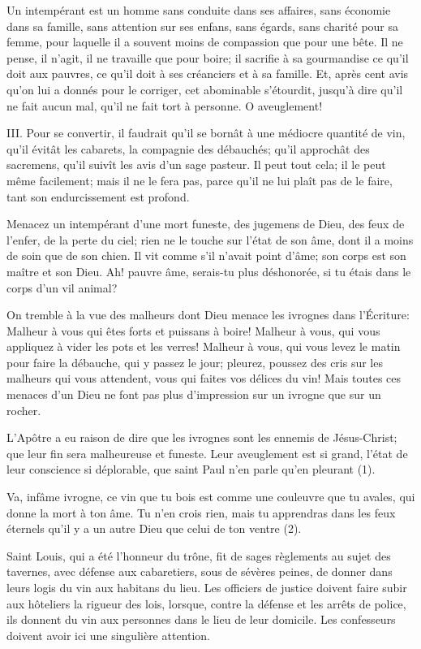 \documentclass[instructions.tex]{subfiles}
\begin{document}
Un intempérant est un homme sans conduite dans ses affaires, sans économie dans sa famille, sans attention sur ses enfans, sans égards, sans charité pour sa femme, pour laquelle il a souvent moins de compassion que pour une bête. Il ne pense, il n'agit, il ne travaille que pour boire; il sacrifie à sa gourmandise ce qu'il doit aux pauvres, ce qu'il doit à ses créanciers et à sa famille. Et, après cent avis qu'on lui a donnés pour le corriger, cet abominable s'étourdit, jusqu'à dire qu'il ne fait aucun mal, qu'il ne fait tort à personne. O aveuglement!
 
III. Pour se convertir, il faudrait qu'il se bornât à une médiocre quantité de vin, qu'il évitât les cabarets, la compagnie des débauchés; qu'il approchât des sacremens, qu'il suivît les avis d'un sage pasteur. Il peut tout cela; il le peut même facilement; mais il ne le fera pas, parce qu'il ne lui plaît pas de le faire, tant son endurcissement est profond.
 
Menacez un intempérant d'une mort funeste, des jugemens de Dieu, des feux de l'enfer, de la perte du ciel; rien ne le touche sur l'état de son âme, dont il a moins de soin que de son chien. Il vit comme s'il n'avait point d'âme; son corps est son maître et son Dieu. Ah! pauvre âme, serais-tu plus déshonorée, si tu étais dans le corps d'un vil animal?
 
On tremble à la vue des malheurs dont Dieu menace les ivrognes dans l'Écriture: Malheur à vous qui êtes forts et puissans à boire! Malheur à vous, qui vous appliquez à vider les pots et les verres! Malheur à vous, qui vous levez le matin pour faire la débauche, qui y passez le jour; pleurez, poussez des cris sur les malheurs qui vous attendent, vous qui faites vos délices du vin! Mais toutes ces menaces d'un Dieu ne font pas plus d'impression sur un ivrogne que sur un rocher.
 
L'Apôtre a eu raison de dire que les ivrognes sont les ennemis de Jésus-Christ; que leur fin sera malheureuse et funeste. Leur aveuglement est si grand, l'état de leur conscience si déplorable, que saint Paul n'en parle qu'en pleurant (1).
 
Va, infâme ivrogne, ce vin que tu bois est comme une couleuvre que tu avales, qui donne la mort à ton âme. Tu n'en crois rien, mais tu apprendras dans les feux éternels qu'il y a un autre Dieu que celui de ton ventre (2).
 
Saint Louis, qui a été l'honneur du trône, fit de sages règlements au sujet des tavernes, avec défense aux cabaretiers, sous de sévères peines, de donner dans leurs logis du vin aux habitans du lieu. Les officiers de justice doivent faire subir aux hôteliers la rigueur des lois, lorsque, contre la défense et les arrêts de police, ils donnent du vin aux personnes dans le lieu de leur domicile. Les confesseurs doivent avoir ici une singulière attention.
 
\end{document}
